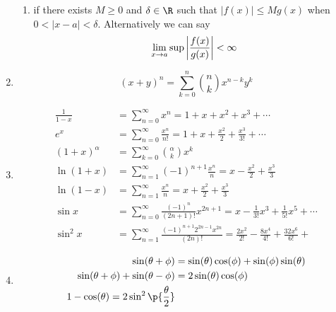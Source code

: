 \documentclass[11pt]{article}
\begin{document}
\begin{enumerate}
\begin{enumerate}
        \item {} if there exists $M\geq 0$ and $\delta \in\R$ such that $|f(x)| \leq M g(x)$ when $0 < |x-a| < \delta$. Alternatively we can say 
        \[
            \lim_{x\to a} \sup \left|\frac{f(x)}{g(x)}\right| < \infty
        \]
    \end{enumerate}
    \item {} 
    \[
        (x+y)^n = \sum_{k=0}^n  \binom{n}{k} x^{n-k} y^k
    \]
    \item {}
    \begin{align*}
        \frac{1}{1-x} 
            &= \sum_{n=0}^{\infty} x^n = 1+x+x^2+x^3+\cdots \\
        e^x 
            &= \sum_{n=0}^{\infty} \frac{x^n}{n!} = 1+x+\frac{x^2}{2}+\frac{x^3}{3!}+\cdots \\
        (1+x)^{\alpha}
            &= \sum_{k=0}^{\infty} \binom{\alpha}{k} x^k \\
        \ln(1+x)
            &= \sum_{n=1}^{\infty} (-1)^{n+1} \frac{x^n}{n} = x - \frac{x^2}{2} + \frac{x^3}{3} \tag{convergent if $|x|<1$} \\
        \ln(1-x)
            &= \sum_{n=1}^{\infty} \frac{x^n}{n} = x + \frac{x^2}{2} + \frac{x^3}{3} \tag{convergent if $|x|<1$} \\
        \sin x
            &= \sum_{n=0}^{\infty} \frac{(-1)^n}{(2n+1)!} x^{2n+1}
            = x - \frac{1}{3!} x^3 + \frac{1}{5!} x^5 + \cdots \\
        \sin^2 x 
            &= \sum_{n=1}^{\infty} \frac{(-1)^{n+1} 2^{2n-1} x^{2n}}{(2n)!}
            = \frac{2 x^2}{2!} - \frac{8x^4}{4!} + \frac{32 x^6}{6!} + 
    \end{align*}
    \item {}
    \begin{align*}
        \sin (\theta + \phi) 
            &= \sin(\theta)\cos(\phi) + \sin(\phi)\sin(\theta) \\
        \sin (\theta + \phi) + \sin (\theta - \phi)
            &= 2\sin (\theta) \cos(\phi) \\
        1 - \cos(\theta) = 2\sin^2 \p{\frac{\theta}{2}}
    \end{align*}
\end{enumerate}


\section{}
\end{document}
